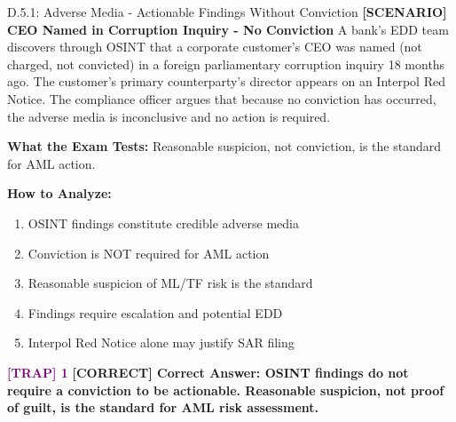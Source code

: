 \documentclass[11pt,a4paper]{beamer}
\newcommand{\trap}[1]{\textcolor{purple}{\textbf{[TRAP] 1}}}
\newcommand{\correct}[1]{\textcolor{green!50!black}{\textbf{[CORRECT] #1}}}
\newcommand{\scenario}[1]{\textcolor{blue!70!black}{\textbf{[SCENARIO] #1}}}
\begin{document}
\begin{frame}{D.5.1: Adverse Media - Actionable Findings Without Conviction}
	\scenario{CEO Named in Corruption Inquiry - No Conviction}
	A bank's EDD team discovers through OSINT that a corporate customer's CEO was named (not charged, not convicted) in a foreign parliamentary corruption inquiry 18 months ago. The customer's primary counterparty's director appears on an Interpol Red Notice. The compliance officer argues that because no conviction has occurred, the adverse media is inconclusive and no action is required.
	
	\vspace{0.1cm}
	\textbf{What the Exam Tests:} Reasonable suspicion, not conviction, is the standard for AML action.
	
	\vspace{0.1cm}
	\textbf{How to Analyze:}
	\begin{enumerate}
		\item OSINT findings constitute credible adverse media
		\item Conviction is NOT required for AML action
		\item Reasonable suspicion of ML/TF risk is the standard
		\item Findings require escalation and potential EDD
		\item Interpol Red Notice alone may justify SAR filing
	\end{enumerate}
	
	\trap{Common Distractor: "No conviction means the adverse media is inconclusive and can be ignored."}
	\correct{Correct Answer: OSINT findings do not require a conviction to be actionable. Reasonable suspicion, not proof of guilt, is the standard for AML risk assessment.}
\end{frame}

\end{document}
